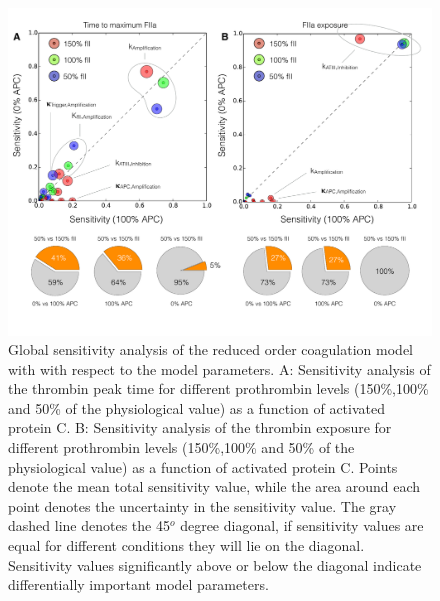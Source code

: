 \documentclass[12pt]{article}
\begin{document}
\begin{figure}
\centering
\includegraphics[width=1.0\textwidth]{./figs/Figure-9-Sensitivity.pdf}
\caption{Global sensitivity analysis of the reduced order coagulation model with with respect to the model parameters.
A: Sensitivity analysis of the thrombin peak time for different prothrombin levels (150\%,100\% and 50\% of the physiological value) as a function of activated protein C. 
B: Sensitivity analysis of the thrombin exposure for different prothrombin levels (150\%,100\% and 50\% of the physiological value) as a function of activated protein C. 
Points denote the mean total sensitivity value, while the area around each point denotes the uncertainty in the sensitivity value. 
The gray dashed line denotes the 45$^{o}$ degree diagonal, if sensitivity values are equal for different conditions they will lie on the diagonal.  
Sensitivity values significantly above or below the diagonal indicate differentially important model parameters.
}\label{fig-sensitivity}
\end{figure}

\clearpage

\renewcommand\thefigure{S\arabic{figure}}
\renewcommand\thetable{T\arabic{table}}
\renewcommand\thepage{S-\arabic{page}}
\renewcommand\theequation{S\arabic{equation}}

\setcounter{equation}{0}
\setcounter{table}{0}
\setcounter{figure}{0}
\setcounter{page}{1}
\end{document}

